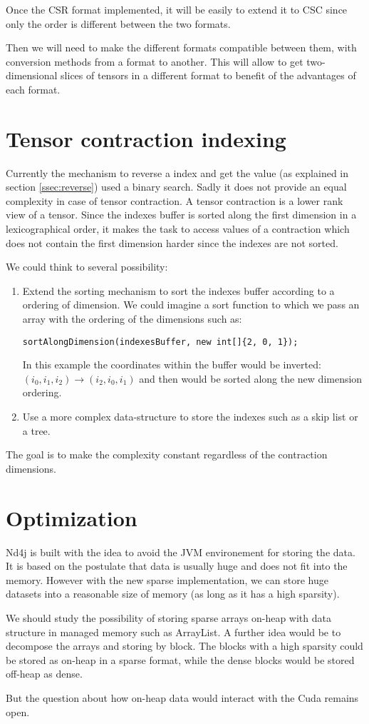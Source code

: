 Once the CSR format implemented, it will be easily to extend it to CSC since only the order is different between the two formats.

Then we will need to make the different formats compatible between them, with conversion methods from a format to another. This will allow to get two-dimensional slices of tensors in a different format to benefit of the advantages of each format.

\section{Tensor contraction indexing}

Currently the mechanism to reverse a index and get the value (as explained in section \ref{ssec:reverse}) used a binary search. Sadly it does not provide an equal complexity in case of tensor contraction. A tensor contraction is a lower rank view of a tensor. Since the indexes buffer is sorted along the first dimension in a lexicographical order, it makes the task to access values of a contraction which does not contain the first dimension harder since the indexes are not sorted.

We could think to several possibility:
\begin{enumerate}
	\item Extend the sorting mechanism to sort the indexes buffer according to a ordering of dimension. We could imagine a sort function to which we pass an array with the ordering of the dimensions such as:
	\begin{lstlisting}[style=nonumbers]
		sortAlongDimension(indexesBuffer, new int[]{2, 0, 1});
	\end{lstlisting}
	In this example the coordinates within the buffer would be inverted:\\
	\qquad $(i_{0}, i_{1}, i_{2})  \rightarrow (i_{2}, i_{0}, i_{1})$  
	and then would be sorted along the new dimension ordering.
	\item Use a more complex data-structure to store the indexes such as a skip list or a tree. 
\end{enumerate} 

The goal is to make the complexity constant regardless of the contraction dimensions.


\section{Optimization}
Nd4j is built with the idea to avoid the JVM environement for storing the data. It is based on the postulate that data is usually huge and does not fit into the memory. However with the new sparse implementation, we can store huge datasets into a reasonable size of memory (as long as it has a high sparsity).

We should study the possibility of storing sparse arrays on-heap with data structure in managed memory such as ArrayList. A further idea would be to decompose the arrays and storing by block. The blocks with a high sparsity could be stored as on-heap in a sparse format, while the dense blocks would be stored off-heap as dense.

But the question about how on-heap data would interact with the Cuda remains open.